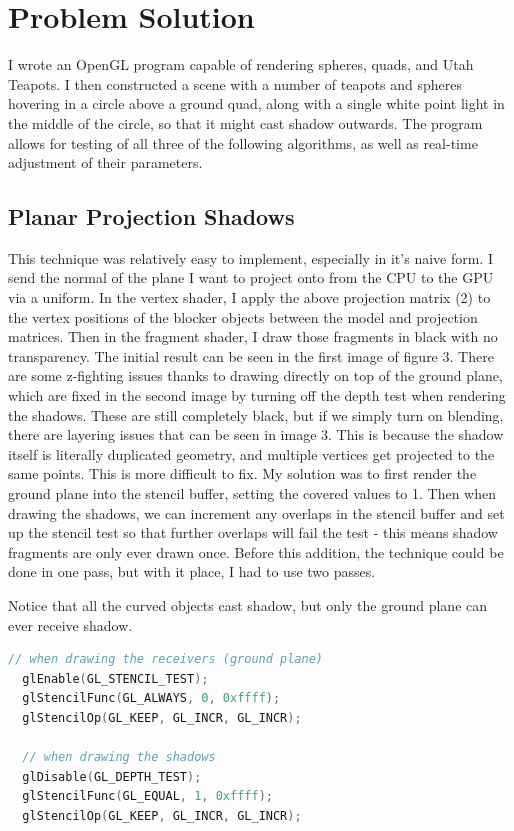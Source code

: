 \documentclass[acmsmall, screen, authorversion, nonacm]{acmart}
\begin{document}
\section{Problem Solution}

I wrote an OpenGL program capable of rendering spheres, quads, and Utah Teapots. I then constructed a scene with a number of teapots and spheres hovering in a circle above a ground quad, along with a single white point light in the middle of the circle, so that it might cast shadow outwards. The program allows for testing of all three of the following algorithms, as well as real-time adjustment of their parameters.

\subsection{Planar Projection Shadows}

This technique was relatively easy to implement, especially in it's naive form. I send the normal of the plane I want to project onto from the CPU to the GPU via a uniform. In the vertex shader, I apply the above projection matrix (2) to the vertex positions of the blocker objects between the model and projection matrices. Then in the fragment shader, I draw those fragments in black with no transparency. The initial result can be seen in the first image of figure 3. There are some z-fighting issues thanks to drawing directly on top of the ground plane, which are fixed in the second image by turning off the depth test when rendering the shadows. These are still completely black, but if we simply turn on blending, there are layering issues that can be seen in image 3. This is because the shadow itself is literally duplicated geometry, and multiple vertices get projected to the same points. This is more difficult to fix. My solution was to first render the ground plane into the stencil buffer, setting the covered values to 1. Then when drawing the shadows, we can increment any overlaps in the stencil buffer and set up the stencil test so that further overlaps will fail the test - this means shadow fragments are only ever drawn once. Before this addition, the technique could be done in one pass, but with it place, I had to use two passes.

Notice that all the curved objects cast shadow, but only the ground plane can ever receive shadow.

\begin{lstlisting}[language=C]
  // when drawing the receivers (ground plane)
  glEnable(GL_STENCIL_TEST);
  glStencilFunc(GL_ALWAYS, 0, 0xffff);
  glStencilOp(GL_KEEP, GL_INCR, GL_INCR);

  // when drawing the shadows
  glDisable(GL_DEPTH_TEST);
  glStencilFunc(GL_EQUAL, 1, 0xffff);
  glStencilOp(GL_KEEP, GL_INCR, GL_INCR);
\end{lstlisting}
\end{document}
